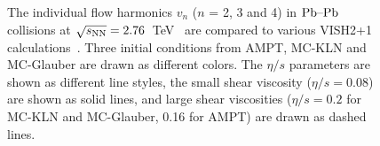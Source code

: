 \begin{figure}[h]
\begin{center}
        \caption{The individual flow harmonics $v_n$ ($n$ = 2, 3 and 4) in $\textnormal{Pb--Pb}$ collisions at $\sqrt{s_{\textnormal{NN}}}=2.76$~TeV~\cite{Adam:2016izf} are compared to various VISH2+1 calculations~\cite{Zhu:2016puf}. Three initial conditions from AMPT, MC-KLN and MC-Glauber are drawn as different colors. The $\eta/s$ parameters are shown as different line styles, the small shear viscosity ($\eta/s = 0.08$) are shown as solid lines, and large shear viscosities ($\eta/s = 0.2$ for MC-KLN and MC-Glauber, 0.16 for AMPT) are drawn as dashed lines.}
        \label{fig:Figure_A2}
              \end{center}
\end{figure}

